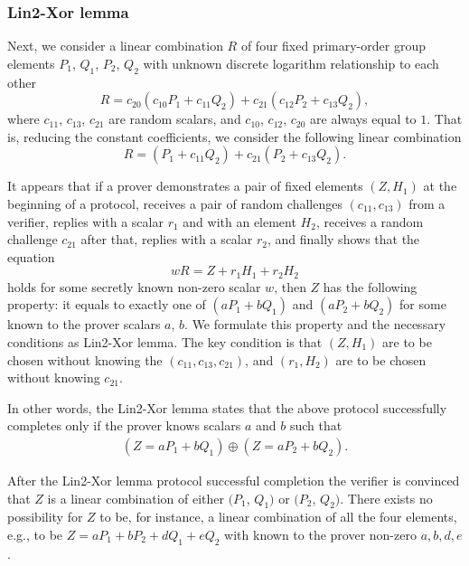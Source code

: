 \documentclass{mathcryptology} %
\theoremstyle{title}
\theoremstyle{titleof}
\begin{document}
\subsubsection{Lin2-Xor lemma}
    Next, we consider a linear combination $R$ of four fixed primary-order group elements $P_{1}$, $Q_{1}$, $P_{2}$, $Q_{2}$ with unknown discrete logarithm relationship to each other
    \begin{equation*}
        R = c_{20} \left(c_{10}P_{1}+c_{11}Q_{2}\right)+c_{21}\left(c_{12}P_{2}+c_{13}Q_{2}\right),
    \end{equation*}
    where $c_{11}$, $c_{13}$, $c_{21}$ are random scalars, and $c_{10}$, $c_{12}$, $c_{20}$ are always equal to $1$. That is, reducing the constant coefficients, we consider the following linear combination
    \begin{equation*}
        R = \left( P_{1} + c_{11} Q_{2}\right) + c_{21} \left(P_{2}+c_{13}Q_{2}\right).
    \end{equation*}
    
    It appears that if a prover demonstrates a pair of fixed elements $(Z, H_{1})$ at the beginning of a protocol, receives a pair of random challenges $(c_{11}, c_{13})$ from a verifier, replies with a scalar $r_{1}$ and with an element $H_{2}$, receives a random challenge $c_{21}$ after that, replies with a scalar $r_{2}$, and finally shows that the equation  
    \begin{equation*}
        wR = Z + r_{1}H_{1} + r_{2}H_{2}
    \end{equation*}
    holds for some secretly known non-zero scalar $w$, then $Z$ has the following property: it equals to exactly one of $\left(a P_{1} + b Q_{1}\right)$ and $\left(a P_{2}+ b Q_{2}\right)$ for some known to the prover scalars $a$, $b$. We formulate this property and the necessary conditions as Lin2-Xor lemma. The key condition is that $\left(Z, H_{1}\right)$ are to be chosen without knowing the $\left(c_{11}, c_{13}, c_{21}\right)$, and $\left(r_{1}, H_{2}\right)$ are to be chosen without knowing $c_{21}$.    
    
    In other words, the Lin2-Xor lemma states that the above protocol successfully completes only if the prover knows scalars $a$ and $b$ such that
    \begin{align*}
        (Z=aP_{1}+bQ_{1}) \oplus (Z=aP_{2}+bQ_{2}).
    \end{align*}     
    
    After the Lin2-Xor lemma protocol successful completion the verifier is convinced that $Z$ is a linear combination of either $(P_{1}$, $Q_{1})$ or $(P_{2}$, $Q_{2})$. There exists no possibility for $Z$ to be, for instance, a linear combination of all the four elements, e.g., to be $Z=aP_{1}+ bP_{2}+dQ_{1}+eQ_{2}$ with known to the prover non-zero $a, b, d, e$.  
    
\end{document}
